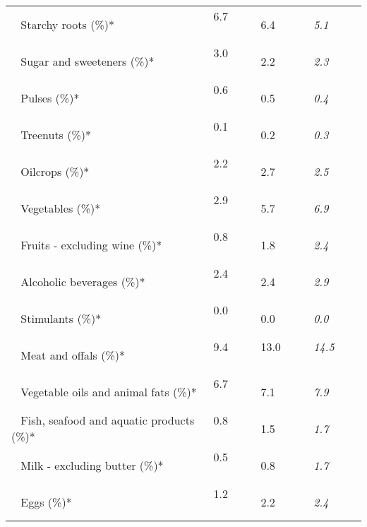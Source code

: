 \begin{tabular}{L{3.9cm} R{1cm} R{1cm} R{1cm}}
	 ~ Starchy roots (\%)* & 6.7 ~ \ \ & 6.4 ~ \ \ & \textit{5.1} ~ \ \ \\ 
	 ~ Sugar and sweeteners (\%)* & 3.0 ~ \ \ & 2.2 ~ \ \ & \textit{2.3} ~ \ \ \\ 
	 ~ Pulses (\%)* & 0.6 ~ \ \ & 0.5 ~ \ \ & \textit{0.4} ~ \ \ \\ 
	 ~ Treenuts (\%)* & 0.1 ~ \ \ & 0.2 ~ \ \ & \textit{0.3} ~ \ \ \\ 
	 ~ Oilcrops (\%)* & 2.2 ~ \ \ & 2.7 ~ \ \ & \textit{2.5} ~ \ \ \\ 
	 ~ Vegetables (\%)* & 2.9 ~ \ \ & 5.7 ~ \ \ & \textit{6.9} ~ \ \ \\ 
	 ~ Fruits - excluding wine (\%)* & 0.8 ~ \ \ & 1.8 ~ \ \ & \textit{2.4} ~ \ \ \\ 
	 ~ Alcoholic beverages (\%)* & 2.4 ~ \ \ & 2.4 ~ \ \ & \textit{2.9} ~ \ \ \\ 
	 ~ Stimulants (\%)* & 0.0 ~ \ \ & 0.0 ~ \ \ & \textit{0.0} ~ \ \ \\ 
	 ~ Meat and offals (\%)* & 9.4 ~ \ \ & 13.0 ~ \ \ & \textit{14.5} ~ \ \ \\ 
	 ~ Vegetable oils and animal fats (\%)* & 6.7 ~ \ \ & 7.1 ~ \ \ & \textit{7.9} ~ \ \ \\ 
	 ~ Fish, seafood and aquatic products (\%)* & 0.8 ~ \ \ & 1.5 ~ \ \ & \textit{1.7} ~ \ \ \\ 
	 ~ Milk - excluding butter (\%)* & 0.5 ~ \ \ & 0.8 ~ \ \ & \textit{1.7} ~ \ \ \\ 
	 ~ Eggs (\%)* & 1.2 ~ \ \ & 2.2 ~ \ \ & \textit{2.4} ~ \ \ \\ 
       \toprule
      \end{tabular}
      \clearpage
{}
